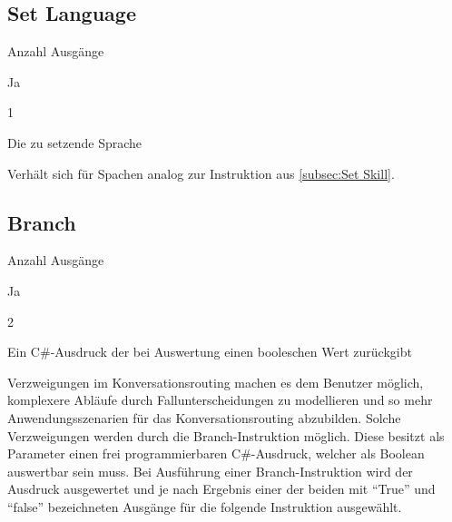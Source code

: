 \subsection{Set Language}
\begin{labeling}{Anzahl Ausgänge}
\item [Eingang] Ja
\item [Anzahl Ausgänge] 1
\item [Parameter] Die zu setzende Sprache
\item [Beschreibung] Verhält sich für Spachen analog zur Instruktion aus \ref{subsec:Set Skill}.
\end{labeling}

\subsection{Branch}
\begin{labeling}{Anzahl Ausgänge}
\item [Eingang] Ja
\item [Anzahl Ausgänge] 2
\item [Parameter] Ein C\#-Ausdruck der bei Auswertung einen booleschen Wert zurückgibt
\item [Beschreibung] Verzweigungen im Konversationsrouting machen es dem Benutzer möglich, komplexere Abläufe durch Fallunterscheidungen zu modellieren und so mehr Anwendungsszenarien für das Konversationsrouting abzubilden. Solche Verzweigungen werden durch die  Branch-Instruktion möglich. Diese besitzt als Parameter einen frei programmierbaren C\#-Ausdruck, welcher als Boolean auswertbar sein muss. Bei Ausführung einer Branch-Instruktion wird der Ausdruck ausgewertet und je nach Ergebnis einer der beiden mit ``True'' und ``false'' bezeichneten  Ausgänge für die folgende Instruktion ausgewählt.
\end{labeling}

